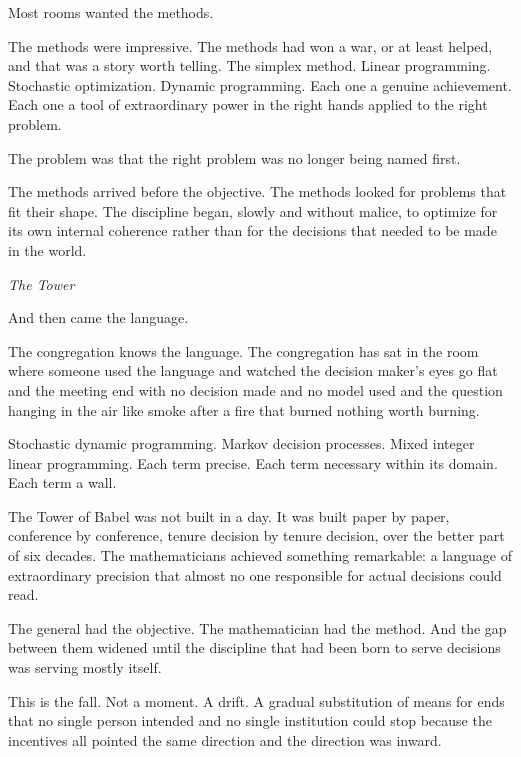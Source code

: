 Most rooms wanted the methods.

The methods were impressive. The methods had won a war, or at least helped, and that was a story worth telling. The simplex method. Linear programming. Stochastic optimization. Dynamic programming. Each one a genuine achievement. Each one a tool of extraordinary power in the right hands applied to the right problem.

The problem was that the right problem was no longer being named first.

The methods arrived before the objective. The methods looked for problems that fit their shape. The discipline began, slowly and without malice, to optimize for its own internal coherence rather than for the decisions that needed to be made in the world.

\vspace{1.5em}
\begin{center}
  \small\itshape The Tower
\end{center}
\vspace{1.5em}

And then came the language.

The congregation knows the language. The congregation has sat in the room where someone used the language and watched the decision maker's eyes go flat and the meeting end with no decision made and no model used and the question hanging in the air like smoke after a fire that burned nothing worth burning.

Stochastic dynamic programming. Markov decision processes. Mixed integer linear programming. Each term precise. Each term necessary within its domain. Each term a wall.

The Tower of Babel was not built in a day. It was built paper by paper, conference by conference, tenure decision by tenure decision, over the better part of six decades. The mathematicians achieved something remarkable: a language of extraordinary precision that almost no one responsible for actual decisions could read.

The general had the objective. The mathematician had the method. And the gap between them widened until the discipline that had been born to serve decisions was serving mostly itself.

This is the fall. Not a moment. A drift. A gradual substitution of means for ends that no single person intended and no single institution could stop because the incentives all pointed the same direction and the direction was inward.

